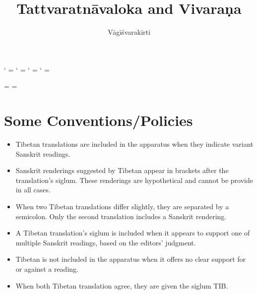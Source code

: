 \documentclass[12pt]{article}
\title{Tattvaratnāvaloka and Vivaraṇa}
\author{Vāgīśvarakīrti}
\begin{document}
\maketitle

\makeatletter
\newXeTeXintercharclass\noextraclass
\XeTeXcharclass `\? = \noextraclass
\XeTeXcharclass `\! = \noextraclass
\XeTeXcharclass `\; = \noextraclass
\XeTeXcharclass `\: = \noextraclass

\AddOpEmph{|}
\AddOpEmph{/}

 \noextraclass = {\nobreak}
\XeTeXinterchartoks {} = {\nobreak}
\makeatother

\newcommand{\PCreading}{$^{pc}$}
\newcommand{\ACreading}{$^{ac}$}
\newcommand{\MS}{K}
\newcommand{\EDD}{E\textsubscript{DH}}
\newcommand{\TM}{TM\textsubscript{D}}
\newcommand{\TVA}{TVA\textsubscript{D}}
\newcommand{\TVB}{TVB\textsubscript{G}}
\newcommand{\TIB}{TIB}
\newcommand{\sigmareading}[1]{$\Sigma$\textsubscript{#1}}

\newcommand{\emd} {\emph{em.}}
\newcommand{\conj} {\emph{conj.}}
\newcommand{\possibleconj} {\emph{possible conj.}}
\newcommand{\corr} {\emph{corr.}}
\newcommand{\diag} {\emph{diag.\ conj.}}
\newcommand{\possibleemd} {\emph{possible em.}}

\section*{Some Conventions/Policies}
\begin{itemize}
    \item Tibetan translations are included in the apparatus when they indicate variant Sanskrit readings.
    
    \item Sanskrit renderings suggested by Tibetan appear in brackets after the translation's siglum. These renderings are hypothetical and cannot be provide in all cases.
    
    \item When two Tibetan translations differ slightly, they are separated by a semicolon. Only the second translation includes a Sanskrit rendering.
    
    \item A Tibetan translation's siglum is included when it appears to support one of multiple Sanskrit readings, based on the editors' judgment.
    
    \item Tibetan is not included in the apparatus when it offers no clear support for or against a reading.

	\item When both Tibetan translation agree, they are given the siglum \TIB .
\end{itemize}
\end{document}
